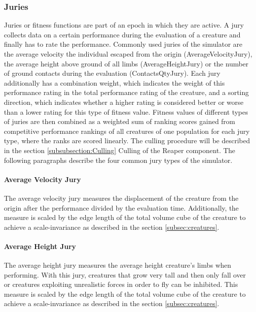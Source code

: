 \documentclass[main]{subfiles}
\begin{document}
\subsubsection{Juries}

Juries or fitness functions are part of an epoch in which they are active. %
%
A jury collects data on a certain performance during the evaluation of a creature and finally has to rate the performance. %
%
Commonly used juries of the simulator are the average velocity the individual escaped from the origin (AverageVelocityJury), the average height above ground of all limbs (AverageHeightJury) or the number of ground contacts during the evaluation (ContactsQtyJury). %
%
Each jury additionally has a combination weight, which indicates the weight of this performance rating in the total performance rating of the creature, and a sorting direction, which indicates whether a higher rating is considered better or worse than a lower rating for this type of fitness value. %
%
Fitness values of different types of juries are then combined as a weighted sum of ranking scores gained from competitive performance rankings of all creatures of one population for each jury type, where the ranks are scored linearly. %
%
The culling procedure will be described in the section \ref{subsubsection:Culling} Culling of the Reaper component. %
%
The following paragraphs describe the four common jury types of the simulator.

\paragraph{Average Velocity Jury} The average velocity jury measures the displacement of the creature from the origin after the performance divided by the evaluation time. %
%
Additionally, the measure is scaled by the edge length of the total volume cube of the creature to achieve a scale-invariance as described in the section \ref{subsec:creatures}.

\paragraph{Average Height Jury} The average height jury measures the average height creature's limbs when performing. %
%
With this jury, creatures that grow very tall and then only fall over or creatures exploiting unrealistic forces in order to fly can be inhibited. %
%
This measure is scaled by the edge length of the total volume cube of the creature to achieve a scale-invariance as described in the section \ref{subsec:creatures}.
\end{document}
